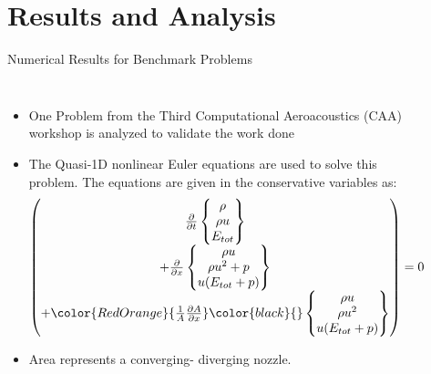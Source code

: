 \section{Results and Analysis}
\begin{frame}{Numerical Results for Benchmark
Problems}
\begin{columns}
        \begin{itemize}
            \item One Problem from the Third Computational Aeroacoustics (CAA) workshop is analyzed to validate the work done
            \item The Quasi-1D nonlinear Euler equations are used to solve this problem. The equations are given in the conservative variables as:
\begin{equation*}
\left(\begin{matrix}
    \frac{\partial{}}{\partial{t}} 
    \left\{\begin{matrix}
        \rho \\
        \rho{u} \\
        E_{tot}
  \end{matrix}\right\}\\
   +\frac{\partial{}}{\partial{x}}
    \left\{\begin{matrix}
        \rho{u} \\
        \rho{u^2}+p \\
        u(E_{tot}+p)
  \end{matrix}\right\} \\
  +\color{RedOrange}{\frac{1}{A}\frac{\partial{A}}{\partial{x}}}\color{black}{}
    \left\{\begin{matrix}
        \rho{u} \\
        \rho{u^2} \\
        u(E_{tot}+p)
  \end{matrix}\right\}
\end{matrix}\right)= 0
\end{equation*} 
        \item Area represents a converging- diverging nozzle.
        \end{itemize}   
        \begin{figure}[hbt!]
            \centering
            \includegraphics[width=1.0\textwidth]{Figures/Area_dX}

\end{figure}
\end{columns}
\end{frame}
